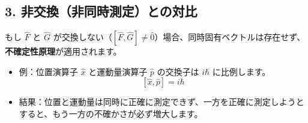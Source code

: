 \documentclass{ltjsarticle}
\begin{document}
\subsection*{3. 非交換（非同時測定）との対比}

もし $\hat{F}$ と $\hat{G}$ が交換しない（$[ \hat{F}, \hat{G} ] \ne \hat{0}$）場合、同時固有ベクトルは存在せず、\textbf{不確定性原理}が適用されます。

\begin{itemize}
    \item 例：位置演算子 $\hat{x}$ と運動量演算子 $\hat{p}$ の交換子は $i\hbar$ に比例します。
    \[
    [\hat{x}, \hat{p}] = i\hbar
    \]
    \item 結果：位置と運動量は同時に正確に測定できず、一方を正確に測定しようとすると、もう一方の不確かさが必ず増大します。
\end{itemize}
\end{document}
